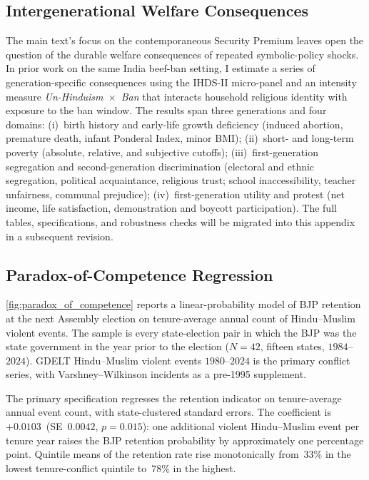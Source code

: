 \subsection{Intergenerational Welfare Consequences} \label{app:intergenerational}

The main text's focus on the contemporaneous Security Premium leaves open the
question of the durable welfare consequences of repeated symbolic-policy
shocks. In prior work on the same India beef-ban setting, I estimate a series
of generation-specific consequences using the IHDS-II micro-panel and an
intensity measure \textit{Un-Hinduism~$\times$~Ban} that interacts household
religious identity with exposure to the ban window. The results span three
generations and four domains: (i)~birth history and early-life growth
deficiency (induced abortion, premature death, infant Ponderal Index, minor
BMI); (ii)~short- and long-term poverty (absolute, relative, and subjective
cutoffs); (iii)~first-generation segregation and second-generation
discrimination (electoral and ethnic segregation, political acquaintance,
religious trust; school inaccessibility, teacher unfairness, communal
prejudice); (iv)~first-generation utility and protest (net income, life
satisfaction, demonstration and boycott participation). The full tables,
specifications, and robustness checks will be migrated into this appendix in a subsequent revision.

\subsection{Paradox-of-Competence Regression}\label{app:paradox_regression}

\autoref{fig:paradox_of_competence} reports a linear-probability model of
BJP retention at the next Assembly election on tenure-average annual count
of Hindu--Muslim violent events. The sample is every state-election pair in
which the BJP was the state government in the year prior to the election
($N=42$, fifteen states, $1984$--$2024$). GDELT Hindu--Muslim violent
events $1980$--$2024$ is the primary conflict series, with
Varshney--Wilkinson incidents as a pre-1995 supplement.

The primary specification regresses the retention indicator on
tenure-average annual event count, with state-clustered standard
errors. The coefficient is~$+0.0103$~(SE~$0.0042$, $p=0.015$): one
additional violent Hindu--Muslim event per tenure year raises the BJP
retention probability by approximately one percentage point. Quintile
means of the retention rate rise monotonically from~$33\%$ in the lowest
tenure-conflict quintile to~$78\%$ in the highest.

